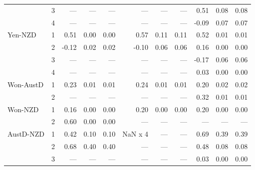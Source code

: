 \documentclass[12pt]{article}
\begin{document}
\begin{table}
\begin{threeparttable}
\begin{tabular}[c]{l c r r r | r r r | r r r}
		  & 3 & --- & --- & --- & ---  & ---  & ---  & 0.51  & 0.08  & 0.08  \\
		  & 4 & --- & --- & --- & ---  & ---  & ---  & -0.09  & 0.07  & 0.07  \\
\noalign{\smallskip} \noalign{\smallskip}
Yen-NZD & 1 & 0.51 & 0.00 & 0.00 & 0.57  & 0.11  & 0.11  & 0.52  & 0.01  & 0.01  \\
	    & 2 & -0.12 & 0.02 & 0.02 & -0.10  & 0.06  & 0.06  & 0.16  & 0.00  & 0.00  \\
	    & 3 & --- & --- & --- & ---  & ---  & ---  & -0.17  & 0.06  & 0.06  \\
	    & 4 & --- & --- & --- & ---  & ---  & ---  & 0.03  & 0.00  & 0.00  \\
\noalign{\smallskip}
\hline
\noalign{\smallskip} \noalign{\smallskip}
Won-AustD & 1 & 0.23 & 0.01 & 0.01 & 0.24  & 0.01  & 0.01  & 0.20  & 0.02  & 0.02  \\
          & 2 & --- & --- & --- & ---  & ---  & ---  & 0.32  & 0.01  & 0.01  \\
\noalign{\smallskip} \noalign{\smallskip}
Won-NZD & 1 & 0.16 & 0.00 & 0.00 & 0.20  & 0.00  & 0.00  & 0.20  & 0.00  & 0.00  \\
	    & 2 & 0.60 & 0.00 & 0.00 & ---  & ---  & ---  & ---  & ---  & ---  \\
\noalign{\smallskip}
\hline
\noalign{\smallskip} \noalign{\smallskip}
AustD-NZD & 1 & 0.42 & 0.10 & 0.10 & NaN x 4 & ---  & ---  & 0.69  & 0.39  & 0.39  \\
	      & 2 & 0.68 & 0.40 & 0.40 & ---  & ---  & ---  & 0.48  & 0.08  & 0.08  \\
	      & 3 & --- & --- & --- & ---  & ---  & ---  & 0.03  & 0.00  & 0.00  \\
\hline \hline
	\end{tabular}
\end{threeparttable}
\end{table}
\end{document}
